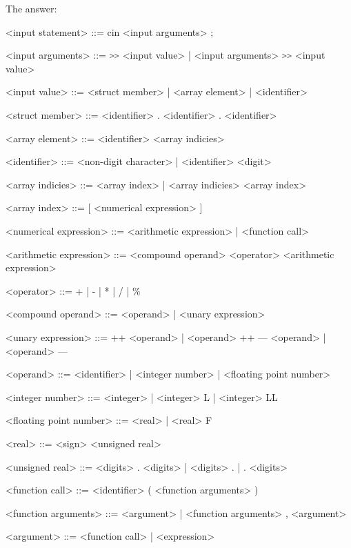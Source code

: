 \documentclass{article}
\begin{document}
		The answer:
		
	\ttfamily
	
	
	
	\begin{grammar}
	
		<input statement> ::= cin <input arguments> ;
		
		<input arguments> ::= \lstinline[language=bash]/>>/ <input value> | <input arguments> \lstinline[language=bash]/>>/ <input value>
		
		<input value> ::= <struct member> | <array element> | <identifier>
		
		<struct member> ::= <identifier> . <identifier>
					   \alt <struct member> . <identifier> 
		
		<array element> ::= <identifier> <array indicies>
		
		<identifier> ::= <non-digit character> | <identifier> <digit>
		
		<array indicies> ::= <array index> | <array indicies> <array index>
		
		<array index> ::= [ <numerical expression> ]
		
		<numerical expression> ::= <arithmetic expression> | <function call>
							  					
		<arithmetic expression> ::= <compound operand>
							   \alt <arithmetic expression> <operator> <arithmetic expression>

		<operator> ::= + | - | * | / | \% 
		
		<compound operand> ::= <operand> | <unary expression>

		<unary expression> ::= ++ <operand> | <operand> ++ 
							 \alt --- <operand> | <operand> ---
									 
		<operand> ::= <identifier> | <integer number> | <floating point number>
		
		<integer number> ::= <integer> | <integer> L | <integer> LL
		
		<floating point number> ::= <real> | <real> F
		
		<real> ::= <sign> <unsigned real>
		
		<unsigned real> ::= <digits> . <digits> | <digits> . | . <digits>
				
		<function call> ::= <identifier> ( <function arguments> )
		
		<function arguments> ::= <argument> | <function arguments> , <argument>
				
		<argument> ::= <function call> | <expression>
		

\end{grammar}
\end{document}
